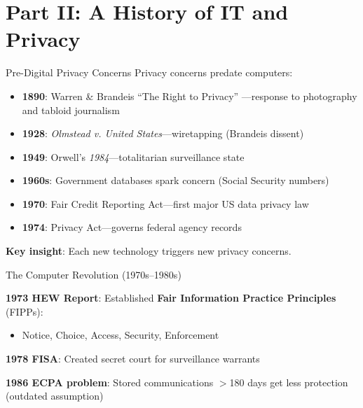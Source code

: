 ﻿\documentclass[aspectratio=169,11pt]{beamer}
\begin{document}
\section{Part II: A History of IT and Privacy}

\begin{frame}{Pre-Digital Privacy Concerns}
Privacy concerns predate computers:

\begin{itemize}
    \item \textbf{1890}: Warren \& Brandeis ``The Right to Privacy'' \parencite{warren_brandeis_privacy}---response to photography and tabloid journalism
    \item \textbf{1928}: \emph{Olmstead v. United States}---wiretapping (Brandeis dissent)
    \item \textbf{1949}: Orwell's \emph{1984}---totalitarian surveillance state
    \item \textbf{1960s}: Government databases spark concern (Social Security numbers)
    \item \textbf{1970}: Fair Credit Reporting Act---first major US data privacy law
    \item \textbf{1974}: Privacy Act---governs federal agency records
\end{itemize}

\vspace{0.3em}
\textbf{Key insight}: Each new technology triggers new privacy concerns.
\end{frame}

\begin{frame}{The Computer Revolution (1970s--1980s)}
\begin{center}
\end{center}

\vspace{0.3em}
\textbf{1973 HEW Report}: Established \textbf{Fair Information Practice Principles} (FIPPs):
\begin{itemize}
    \item Notice, Choice, Access, Security, Enforcement
\end{itemize}

\textbf{1978 FISA}: Created secret court for surveillance warrants

\textbf{1986 ECPA problem}: Stored communications $>$180 days get less protection (outdated assumption)
\end{frame}
\end{document}
